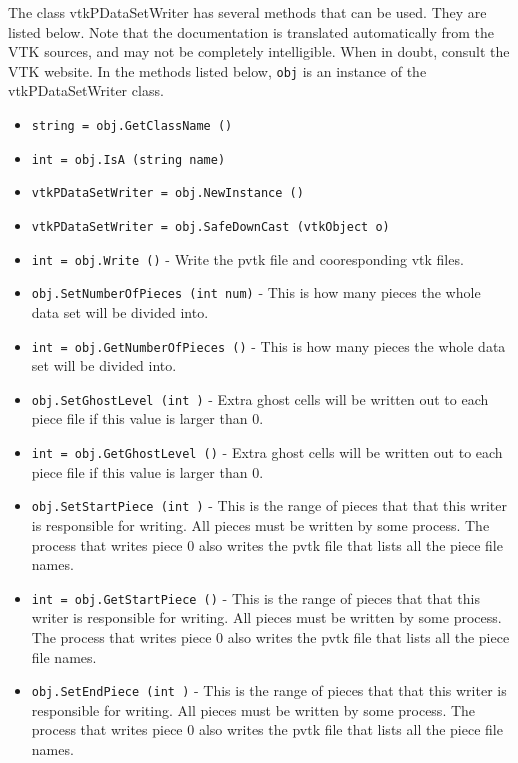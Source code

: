 The class vtkPDataSetWriter has several methods that can be used.
  They are listed below.
Note that the documentation is translated automatically from the VTK sources,
and may not be completely intelligible.  When in doubt, consult the VTK website.
In the methods listed below, \verb|obj| is an instance of the vtkPDataSetWriter class.
\begin{itemize}
\item  \verb|string = obj.GetClassName ()|

\item  \verb|int = obj.IsA (string name)|

\item  \verb|vtkPDataSetWriter = obj.NewInstance ()|

\item  \verb|vtkPDataSetWriter = obj.SafeDownCast (vtkObject o)|

\item  \verb|int = obj.Write ()| -  Write the pvtk file and cooresponding vtk files.

\item  \verb|obj.SetNumberOfPieces (int num)| -  This is how many pieces the whole data set will be divided into.

\item  \verb|int = obj.GetNumberOfPieces ()| -  This is how many pieces the whole data set will be divided into.

\item  \verb|obj.SetGhostLevel (int )| -  Extra ghost cells will be written out to each piece file
 if this value is larger than 0.

\item  \verb|int = obj.GetGhostLevel ()| -  Extra ghost cells will be written out to each piece file
 if this value is larger than 0.

\item  \verb|obj.SetStartPiece (int )| -  This is the range of pieces that that this writer is 
 responsible for writing.  All pieces must be written
 by some process.  The process that writes piece 0 also
 writes the pvtk file that lists all the piece file names.

\item  \verb|int = obj.GetStartPiece ()| -  This is the range of pieces that that this writer is 
 responsible for writing.  All pieces must be written
 by some process.  The process that writes piece 0 also
 writes the pvtk file that lists all the piece file names.

\item  \verb|obj.SetEndPiece (int )| -  This is the range of pieces that that this writer is 
 responsible for writing.  All pieces must be written
 by some process.  The process that writes piece 0 also
 writes the pvtk file that lists all the piece file names.


\end{itemize}
